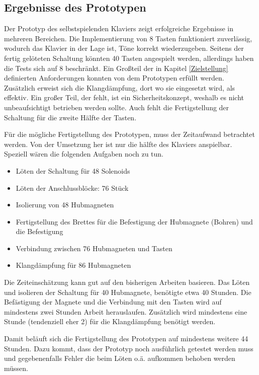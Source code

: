 \subsection{Ergebnisse des Prototypen}\label{ErgebnissePrototyp}
Der Prototyp des selbstspielenden Klaviers zeigt erfolgreiche Ergebnisse in mehreren Bereichen. Die Implementierung von
8 Tasten funktioniert zuverlässig, wodurch das Klavier in der Lage ist, Töne korrekt wiederzugeben. Seitens der
fertig gelöteten Schaltung könnten 40 Tasten angespielt werden, allerdings haben die Tests sich auf 8 beschränkt.
Ein Großteil der in Kapitel \ref{Zielstellung} definierten Anforderungen konnten von dem Prototypen erfüllt werden.
Zusätzlich erweist sich die Klangdämpfung, dort wo sie eingesetzt wird, als effektiv. \newline
Ein großer Teil, der fehlt, ist ein Sicherheitskonzept, weshalb es nicht unbeaufsichtigt betrieben
werden sollte.
Auch fehlt die Fertigstellung der Schaltung für die zweite Hälfte der Tasten.

Für die mögliche Fertigstellung des Prototypen, muss der Zeitaufwand betrachtet werden.
Von der Umsetzung her ist nur die hälfte des Klaviers anspielbar. Speziell wären die folgenden Aufgaben noch zu tun.
\begin{itemize}
    \item Löten der Schaltung für 48 Solenoids
    \item Löten der Anschlussblöcke: 76 Stück
    \item Isolierung von 48 Hubmagneten
    \item Fertigstellung des Brettes für die Befestigung der Hubmagnete (Bohren) und die Befestigung %
    \item Verbindung zwischen 76 Hubmagneten und Tasten
    \item Klangdämpfung für 86 Hubmagneten
\end{itemize}

Die Zeiteinschätzung kann gut auf den bisherigen Arbeiten basieren. Das Löten und isolieren der Schaltung für
40 Hubmagnete, benötigte etwa 40 Stunden. Die Befästigung der Magnete und die Verbindung mit den Tasten wird auf
mindestens zwei Stunden Arbeit herauslaufen.
Zusätzlich wird mindestens eine Stunde (tendenziell eher 2) für die Klangdämpfung benötigt werden.

Damit beläuft sich die Fertigstellung des Prototypen auf mindestens weitere 44 Stunden. Dazu kommt, dass der Prototyp
noch ausführlich getestet werden muss und gegebenenfalls Fehler die beim Löten o.ä. aufkommen behoben werden müssen.

